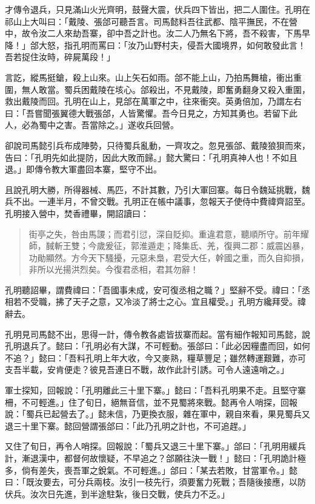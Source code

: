 才傳令退兵，只見滿山火光齊明，鼓聲大震，伏兵四下皆出，把二人圍住。孔明在祁山上大叫曰：「戴陵、張郃可聽吾言。司馬懿料吾往武都、陰平撫民，不在營中，故令汝二人來劫吾寨，卻中吾之計也。汝二人乃無名下將，吾不殺害，下馬早降！」郃大怒，指孔明而罵曰：「汝乃山野村夫，侵吾大國境界，如何敢發此言！吾若捉住汝時，碎屍萬段！」

言訖，縱馬挺鎗，殺上山來。山上矢石如雨。郃不能上山，乃拍馬舞槍，衝出重圍，無人敢當。蜀兵困戴陵在垓心。郃殺出，不見戴陵，即奮勇翻身又殺入重圍，救出戴陵而回。孔明在山上，見郃在萬軍之中，往來衝突。英勇倍加，乃謂左右曰：「吾嘗聞張翼德大戰張郃，人皆驚懼。吾今日見之，方知其勇也。若留下此人，必為蜀中之害。吾當除之。」遂收兵回營。

卻說司馬懿引兵布成陣勢，只待蜀兵亂動，一齊攻之。忽見張郃、戴陵狼狽而來，告曰：「孔明先如此提防，因此大敗而歸。」懿大驚曰：「孔明真神人也！不如且退。」即傳令教大軍盡回本寨，堅守不出。

且說孔明大勝，所得器械、馬匹，不計其數，乃引大軍回寨。每日令魏延挑戰，魏兵不出。一連半月，不曾交戰。孔明正在帳中議事，忽報天子使侍中費禕齊詔至。孔明接入營中，焚香禮畢，開詔讀曰：

\begin{quote}
街亭之失，咎由馬謖；而君引愆，深自貶抑。重違君意，聽順所守。前年耀師，馘斬王雙；今歲爰征，郭淮遁走；降集氐、羌，復興二郡：威震凶暴，功勛顯然。方今天下騷擾，元惡未梟，君受大任，幹國之重，而久自抑損，非所以光揚洪烈矣。今復君丞相，君其勿辭！
\end{quote}

孔明聽詔畢，謂費禕曰：「吾國事未成，安可復丞相之職？」堅辭不受。禕曰：「丞相若不受職，拂了天子之意，又冷淡了將士之心。宜且權受。」孔明方纔拜受。禕辭去。

孔明見司馬懿不出，思得一計，傳令教各處皆拔寨而起。當有細作報知司馬懿，說孔明退兵了。懿曰：「孔明必有大謀，不可輕動。張郃曰：「此必因糧盡而回，如何不追？」懿曰：「吾料孔明上年大收，今又麥熟，糧草豐足；雖然轉運艱難，亦可支吾半載，安肯便走？彼見吾連日不戰，故作此計引誘。可令人遠遠哨之。」

軍士探知，回報說：「孔明離此三十里下寨。」懿曰：「吾料孔明果不走。且堅守寨柵，不可輕進。」住了旬日，絕無音信，並不見蜀將來戰。懿再令人哨探，回報說：「蜀兵已起營去了。」懿未信，乃更換衣服，雜在軍中，親自來看，果見蜀兵又退三十里下寨。懿回營謂張郃曰：「此乃孔明之計也，不可追趕。」

又住了旬日，再令人哨探。回報說：「蜀兵又退三十里下寨。」郃曰：「孔明用緩兵計，漸退漢中，都督何故懷疑，不早追之？郃願往決一戰！」懿曰：「孔明詭計極多，倘有差失，喪吾軍之銳氣。不可輕進。」郃曰：「某去若敗，甘當軍令。」懿曰：「既汝要去，可分兵兩枝。汝引一枝先行，須要奮力死戰；吾隨後接應，以防伏兵。汝次日先進，到半途駐紮，後日交戰，使兵力不乏。」

